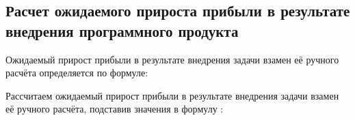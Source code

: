 \subsection{Расчет ожидаемого прироста прибыли в результате внедрения программного продукта}
\label{sec:economics:icomeBoost}

Ожидаемый прирост прибыли в результате внедрения задачи взамен её ручного расчёта определяется по формуле:
\incomeBoostEquation

Рассчитаем ожидаемый прирост прибыли в результате внедрения задачи взамен её ручного расчёта, подставив значения в формулу :
\incomeBoostFormulaApplied
